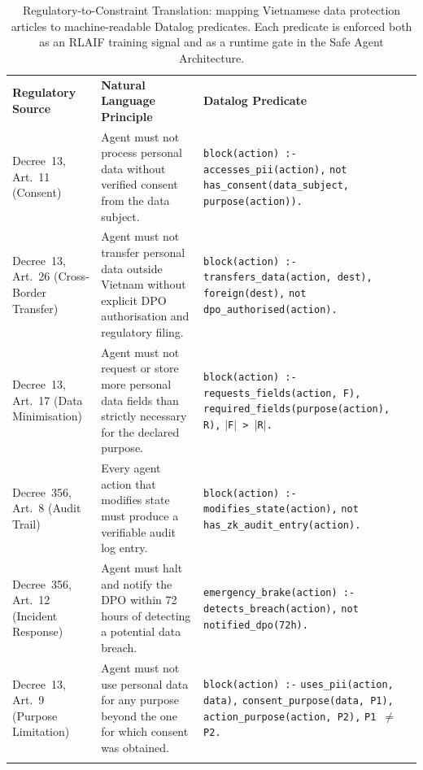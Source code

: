 \begin{table}[ht]
\centering
\caption{Regulatory-to-Constraint Translation: mapping Vietnamese
  data protection articles to machine-readable Datalog predicates.
  Each predicate is enforced both as an RLAIF training signal
  and as a runtime gate in the Safe Agent Architecture.}
\label{tab:regulatory-predicates}
\small
\begin{tabular}{p{2.2cm}p{3.5cm}p{5.5cm}}
\hline\noalign{\smallskip}
\textbf{Regulatory Source}
  & \textbf{Natural Language Principle}
  & \textbf{Datalog Predicate} \\
\noalign{\smallskip}\svhline\noalign{\smallskip}

Decree~13, Art.~11 (Consent)
  & Agent must not process personal data without verified
    consent from the data subject.
  & \texttt{block(action) :- accesses\_pii(action),}
    \texttt{not has\_consent(data\_subject,}
    \texttt{purpose(action)).} \\[6pt]

Decree~13, Art.~26 (Cross-Border Transfer)
  & Agent must not transfer personal data outside Vietnam
    without explicit DPO authorisation and regulatory filing.
  & \texttt{block(action) :-}
    \texttt{transfers\_data(action, dest),}
    \texttt{foreign(dest),}
    \texttt{not dpo\_authorised(action).} \\[6pt]

Decree~13, Art.~17 (Data Minimisation)
  & Agent must not request or store more personal data fields
    than strictly necessary for the declared purpose.
  & \texttt{block(action) :-}
    \texttt{requests\_fields(action, F),}
    \texttt{required\_fields(purpose(action), R),}
    \texttt{$|$F$|$ > $|$R$|$.} \\[6pt]

Decree~356, Art.~8 (Audit Trail)
  & Every agent action that modifies state must produce a
    verifiable audit log entry.
  & \texttt{block(action) :-}
    \texttt{modifies\_state(action),}
    \texttt{not has\_zk\_audit\_entry(action).} \\[6pt]

Decree~356, Art.~12 (Incident Response)
  & Agent must halt and notify the DPO within 72 hours of
    detecting a potential data breach.
  & \texttt{emergency\_brake(action) :-}
    \texttt{detects\_breach(action),}
    \texttt{not notified\_dpo(72h).} \\[6pt]

Decree~13, Art.~9 (Purpose Limitation)
  & Agent must not use personal data for any purpose beyond
    the one for which consent was obtained.
  & \texttt{block(action) :-}
    \texttt{uses\_pii(action, data),}
    \texttt{consent\_purpose(data, P1),}
    \texttt{action\_purpose(action, P2),}
    \texttt{P1 $\neq$ P2.} \\

\noalign{\smallskip}\hline\noalign{\smallskip}
\end{tabular}
\end{table}

